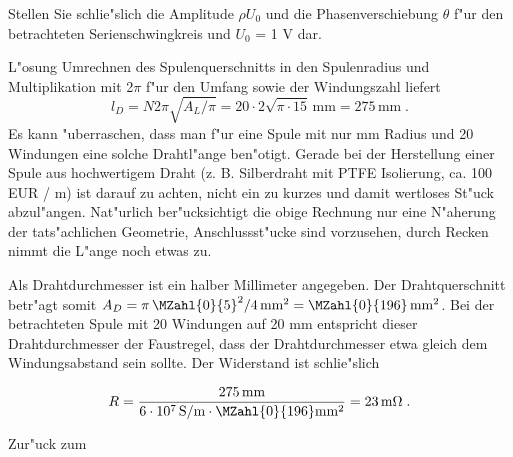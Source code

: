 \begin{MExercises}
\begin{MExercise}
Stellen Sie schlie"slich die Amplitude $\rho U_0$ und die Phasenverschiebung $\theta$ f"ur den betrachteten Serienschwingkreis und $U_0$ = 1 V dar.

\begin{MHint}{L"osung} 
Umrechnen des Spulenquerschnitts in den Spulenradius und Multiplikation mit 2$\pi$ f"ur den Umfang sowie der Windungszahl liefert
\begin{equation}
  l_D=N 2\pi \sqrt{A_L/\pi} = 20\cdot 2 \sqrt{\pi\cdot 15}  \,\text{mm} = 275 \,\text{mm}\; .
\end{equation}
Es kann "uberraschen, dass man f"ur eine Spule mit nur  mm Radius und 20 Windungen eine solche Drahtl"ange ben"otigt. Gerade bei der Herstellung einer Spule aus hochwertigem Draht (z. B. Silberdraht mit PTFE Isolierung, ca. 100 EUR / m) ist darauf zu achten, nicht ein zu kurzes und damit wertloses St"uck abzul"angen. Nat"urlich ber"ucksichtigt die obige Rechnung nur eine N"aherung der tats"achlichen Geometrie, Anschlussst"ucke sind vorzusehen, durch Recken nimmt die L"ange noch etwas zu.

Als Drahtdurchmesser ist ein halber Millimeter angegeben. Der Drahtquerschnitt betr"agt somit $A_D=\pi\,\MZahl{0}{5}^2/4\,\text{mm}^2=\MZahl{0}{196}\,\text{mm}^2 $. Bei der betrachteten Spule mit 20 Windungen auf 20 mm entspricht dieser Drahtdurchmesser der Faustregel, dass der Drahtdurchmesser etwa gleich dem Windungsabstand sein sollte. Der Widerstand ist schlie"slich

\begin{equation}
  R=\frac{275\,\text{mm}}{6\cdot 10^7 \,\text{S/m}\cdot \MZahl{0}{196}\text{mm}^2} = 23 \,\text{m}\Omega\; .
\end{equation}

\begin{center}
  \end{center}

\begin{center}
  \end{center}

\end{MHint}

Zur"uck zum 
\end{MExercise}


\end{MExercises}





